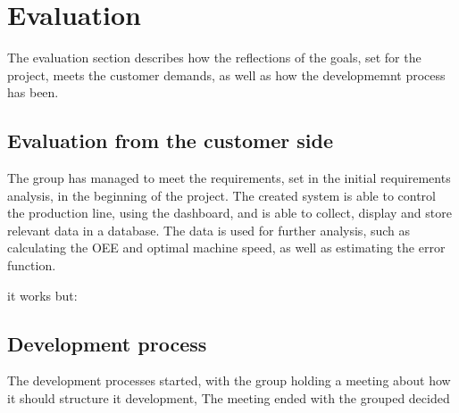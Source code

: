 \section{Evaluation}
The evaluation section describes how the reflections of the goals, set for the
project, meets the customer demands, as well as how the developmemnt process has
been.

\subsection{Evaluation from the customer side}
The group has managed to meet the requirements, set in the initial requirements
analysis, in the beginning of the project. The created system is able to control
the production line, using the dashboard, and is able to collect, display and
store relevant data in a database. The data is used for further analysis, such
as calculating the OEE and optimal machine speed, as well as estimating the
error function.

it works but:


\subsection{Development process}
The development processes started, with the group holding a meeting about
how it should structure it development, The meeting ended with the grouped decided




